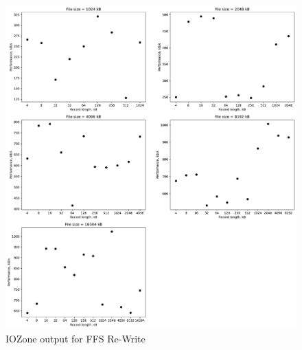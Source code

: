 \begin{figure}[!htb]
	\label{fig:app_bench_ffs_re_write}
	\begin{center}
		\includegraphics[width=1.0\textwidth]{figures/benchmarking/ffs/Re-Write.pdf}
	\end{center}
	\caption{IOZone output for FFS \mbox{Re-Write}}
\end{figure}

